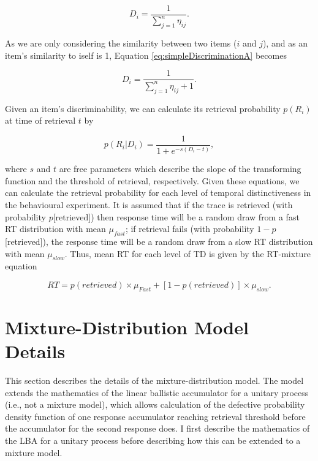 \documentclass[a4paper, jou, natbib]{apa6}
\begin{document}
\begin{equation}
D_{i} = \frac{1}{\sum\limits_{j = 1}^n \eta_{ij}}.
\label{eq:simpleDiscriminationA}
\end{equation}

As we are only considering the similarity between two items ($i$ and $j$), and as an item's similarity to iself is 1, Equation \ref{eq:simpleDiscriminationA} becomes

\begin{equation}
D_{i} = \frac{1}{\sum\limits_{j = 1}^n \eta_{ij} + 1}.
\label{eq:simpleDiscriminationB}
\end{equation}

Given an item's discriminability, we can calculate its retrieval probability $p(R_{i})$ at time of retrieval $t$ by

\begin{equation}
p(R_{i}|D_{i}) = \frac{1}{1 + e^{-s(D_{i} - t)}}, 
\label{eq:simpleProb}
\end{equation}

\noindent where $s$ and $t$ are free parameters which describe the slope of the transforming function and the threshold of retrieval, respectively. Given these equations, we can calculate the retrieval probability for each level of temporal distinctiveness in the behavioural experiment. It is assumed that if the trace is retrieved (with probability $p$[retrieved]) then response time will be a random draw from a fast RT distribution with mean $\mu_{fast}$; if retrieval fails (with probability $1 - p$[retrieved]), the response time will be a random draw from a slow RT distribution with mean $\mu_{slow}$. Thus, mean RT for each level of TD is given by the RT-mixture equation

\begin{equation}
RT = p(retrieved) \times \mu_{Fast} + [1 - p(retrieved)] \times \mu_{slow}.
\label{eq:tdMixtureNew}
\end{equation}
\appendix
\section{Mixture-Distribution Model Details}

This section describes the details of the mixture-distribution model. The model extends the mathematics of the linear ballistic accumulator \cite{Brown2008} for a unitary process (i.e., not a mixture model), which allows calculation of the defective probability density function of one response accumulator reaching retrieval threshold before the accumulator for the second response does. I first describe the mathematics of the LBA for a unitary process before describing how this can be extended to a mixture model. 
\end{document}
